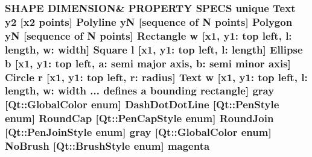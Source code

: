 \subsubsection[{\texorpdfstring{magenta}{magenta}}]{\setlength{\rightskip}{0pt plus 5cm}S\+H\+A\+PE D\+I\+M\+E\+N\+S\+I\+ON\& P\+R\+O\+P\+E\+R\+TY S\+P\+E\+CS unique {\bf Text} {\bf y2} \mbox{[}{\bf x2} points\mbox{]} {\bf Polyline} yN \mbox{[}sequence of N points\mbox{]} {\bf Polygon} yN \mbox{[}sequence of N points\mbox{]} {\bf Rectangle} w \mbox{[}{\bf x1}, y1\+: top left, l\+: length, w\+: width\mbox{]} {\bf Square} {\bf l} \mbox{[}{\bf x1}, y1\+: top left, l\+: length\mbox{]} {\bf Ellipse} b \mbox{[}{\bf x1}, y1\+: top left, a\+: semi major axis, b\+: semi minor axis\mbox{]} {\bf Circle} r \mbox{[}{\bf x1}, y1\+: top left, r\+: radius\mbox{]} {\bf Text} w \mbox{[}{\bf x1}, y1\+: top left, l\+: length, w\+: width ... defines {\bf a} bounding rectangle\mbox{]} gray \mbox{[}Qt\+::\+Global\+Color enum\mbox{]} Dash\+Dot\+Dot\+Line \mbox{[}Qt\+::\+Pen\+Style enum\mbox{]} Round\+Cap \mbox{[}{\bf Qt\+::\+Pen\+Cap\+Style} enum\mbox{]} Round\+Join \mbox{[}{\bf Qt\+::\+Pen\+Join\+Style} enum\mbox{]} gray \mbox{[}Qt\+::\+Global\+Color enum\mbox{]} No\+Brush \mbox{[}{\bf Qt\+::\+Brush\+Style} enum\mbox{]} magenta}\hypertarget{shape__input__file__specs_8txt_a31668012af4e119081d3a9775a7e89b3}{}\label{shape__input__file__specs_8txt_a31668012af4e119081d3a9775a7e89b3}
